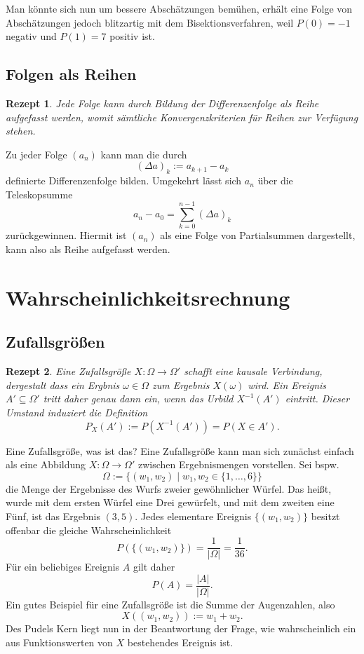 \documentclass[a4paper,10pt,fleqn,twocolumn,twoside,dvipdfmx]{scrartcl}
\theoremstyle{rmbox}
\newtheorem{Rezept}{Rezept}[section]
\begin{document}
Man könnte sich nun um bessere Abschätzungen bemühen, erhält eine
Folge von Abschätzungen jedoch blitzartig mit dem Bisektionsverfahren,
weil $P(0)=-1$ negativ und $P(1)=7$ positiv ist.

\subsection{Folgen als Reihen}

\begin{Rezept}
Jede Folge kann durch Bildung der Differenzenfolge als Reihe
aufgefasst werden, womit sämtliche Konvergenzkriterien für Reihen
zur Verfügung stehen.
\end{Rezept}

\noindent
Zu jeder Folge $(a_n)$ kann man die durch
\[(\Delta a)_k := a_{k+1} - a_k\]
definierte Differenzenfolge bilden. Umgekehrt lässt sich $a_n$ über
die Teleskopsumme
\[a_n-a_0 = \sum_{k=0}^{n-1} (\Delta a)_k\]
zurückgewinnen. Hiermit ist $(a_n)$ als eine Folge von
Partialsummen dargestellt, kann also als Reihe aufgefasst werden.

\newpage
\section{Wahrscheinlichkeitsrechnung}

\subsection{Zufallsgrößen}

\begin{Rezept}
Eine Zufallsgröße $X\colon\Omega\to\Omega'$ schafft eine kausale
Verbindung, dergestalt dass ein Ergbnis $\omega\in\Omega$ zum
Ergebnis $X(\omega)$ wird. Ein Ereignis $A'\subseteq\Omega'$
tritt daher genau dann ein, wenn das Urbild $X^{-1}(A')$ eintritt.
Dieser Umstand induziert die Definition
\[P_X(A') := P(X^{-1}(A')) = P(X\in A').\]
\end{Rezept}

\noindent
Eine Zufallsgröße, was ist das? Eine Zufallsgröße kann man sich
zunächst einfach als eine Abbildung $X\colon\Omega\to\Omega'$ zwischen
Ergebnismengen vorstellen. Sei bspw.
\[\Omega := \{(w_1,w_2)\mid w_1,w_2\in\{1,\ldots,6\}\}\]
die Menge der Ergebnisse des Wurfs zweier gewöhnlicher
Würfel. Das heißt, wurde mit dem ersten Würfel eine Drei
gewürfelt, und mit dem zweiten eine Fünf, ist das Ergebnis $(3, 5)$.
Jedes elementare Ereignis $\{(w_1,w_2)\}$ besitzt offenbar
die gleiche Wahrscheinlichkeit%
\[P(\{(w_1,w_2)\}) = \frac{1}{|\Omega|} = \frac{1}{36}.\]
Für ein beliebiges Ereignis $A$ gilt daher%
\[P(A) = \frac{|A|}{|\Omega|}.\]
Ein gutes Beispiel für eine Zufallsgröße ist die Summe der
Augenzahlen, also%
\[X((w_1,w_2)) := w_1 + w_2.\]
Des Pudels Kern liegt nun in der Beantwortung der Frage, wie
wahrscheinlich ein aus Funktionswerten von $X$ bestehendes
Ereignis ist.
\end{document}

